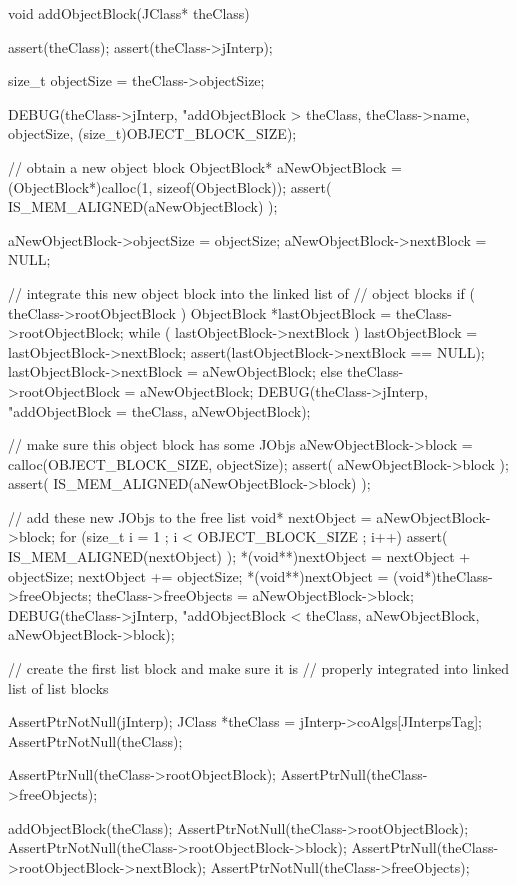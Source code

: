 \startCCode
void addObjectBlock(JClass* theClass) {
  assert(theClass);
  assert(theClass->jInterp);
  
  size_t objectSize = theClass->objectSize;

  DEBUG(theClass->jInterp, "addObjectBlock > %
    theClass, theClass->name, objectSize, (size_t)OBJECT_BLOCK_SIZE);
  
  // obtain a new object block
  ObjectBlock* aNewObjectBlock = 
    (ObjectBlock*)calloc(1, sizeof(ObjectBlock));
  assert( IS_MEM_ALIGNED(aNewObjectBlock) );

  aNewObjectBlock->objectSize = objectSize;
  aNewObjectBlock->nextBlock  = NULL;
  
  // integrate this new object block into the linked list of
  // object blocks
  if ( theClass->rootObjectBlock ) {
    ObjectBlock *lastObjectBlock = theClass->rootObjectBlock;
    while ( lastObjectBlock->nextBlock ) {
      lastObjectBlock = lastObjectBlock->nextBlock;
    }
    assert(lastObjectBlock->nextBlock == NULL);
    lastObjectBlock->nextBlock = aNewObjectBlock;
  } else {
    theClass->rootObjectBlock = aNewObjectBlock;
  }
  DEBUG(theClass->jInterp, "addObjectBlock = %
    theClass, aNewObjectBlock);

  // make sure this object block has some JObjs
  aNewObjectBlock->block = 
    calloc(OBJECT_BLOCK_SIZE, objectSize);
  assert( aNewObjectBlock->block );
  assert( IS_MEM_ALIGNED(aNewObjectBlock->block) );
  
  // add these new JObjs to the free list
  void* nextObject = aNewObjectBlock->block;
  for (size_t i = 1 ; i < OBJECT_BLOCK_SIZE ; i++) {
    assert( IS_MEM_ALIGNED(nextObject) );
    *(void**)nextObject = nextObject + objectSize;
    nextObject += objectSize;
  }
  *(void**)nextObject =
    (void*)theClass->freeObjects;
  theClass->freeObjects = aNewObjectBlock->block;
  DEBUG(theClass->jInterp, "addObjectBlock < %
    theClass, aNewObjectBlock, aNewObjectBlock->block);
}
\stopCCode

\startCTest
  // create the first list block and make sure it is 
  // properly integrated into linked list of list blocks

  AssertPtrNotNull(jInterp);
  JClass *theClass = jInterp->coAlgs[JInterpsTag];
  AssertPtrNotNull(theClass);
  
  AssertPtrNull(theClass->rootObjectBlock);
  AssertPtrNull(theClass->freeObjects);

  addObjectBlock(theClass);
  AssertPtrNotNull(theClass->rootObjectBlock);
  AssertPtrNotNull(theClass->rootObjectBlock->block);
  AssertPtrNull(theClass->rootObjectBlock->nextBlock);
  AssertPtrNotNull(theClass->freeObjects);

